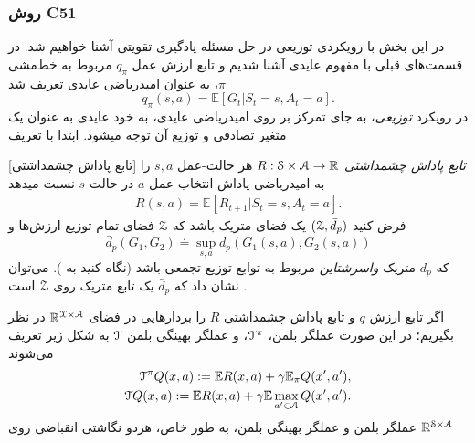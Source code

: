 \subsubsection{روش C51}
در این بخش با رویکردی توزیعی در حل مسئله یادگیری تقویتی آشنا خواهیم شد. در قسمت‌های قبلی با مفهوم عایدی آشنا شدیم و تابع ارزش عمل 
$q_\pi$
مربوط به خط‌مشی $\pi$، به عنوان امیدریاضی عایدی تعریف شد
$$q_\pi(s,a) = \mathbb{E}\left[G_t| S_t=s, A_t = a\right].$$
در رویکرد 
\textit{توزیعی}،
به جای تمرکز بر روی امیدریاضی عایدی، به خود عایدی به عنوان یک متغیر تصادفی و توزیع آن توجه می\nf شود. ابتدا با تعریف 

[تابع پاداش چشمداشتی]
\textit{تابع پاداش چشمداشتی}
$R: \EuScript{S} \times \EuScript{A} \to \mathbb{R}$
هر حالت-عمل $s,a$ را به امیدریاضی پاداش انتخاب عمل $a$ در حالت $s$ نسبت می\nf دهد
\begin{align}
	R(s,a) = \mathbb{E}\left[R_{t+1}|S_t=s, A_t=a\right].
\end{align}
فرض کنید 
$(\EuScript{Z}, \bar{d}_p)$
یک فضای متریک باشد که $\EuScript{Z}$ فضای تمام توزیع ارزش‌ها و
$$\bar{d}_p(G_1, G_2) \doteq \sup_{s,a} d_p(G_1(s,a), G_2(s,a))$$
که $d_p$ متریک 
\textit{واسرشتاین}
مربوط به توابع توزیع تجمعی باشد (نگاه کنید به 
\cite{bickel1981some}).
می‌توان نشان داد که $\bar{d}_p$ یک تابع متریک روی $\EuScript{Z}$ است
\cite{bellemare2017distributional}.

اگر تابع ارزش $q$ و تابع پاداش چشمداشتی $R$ را بردارهایی در فضای 
$\mathbb{R}^{\EuScript{X \times A}}$ 
در نظر بگیریم؛ در این صورت عملگر بلمن، $\EuScript{T}^\pi$، و عملگر بهینگی بلمن $\EuScript{T}$ به شکل زیر تعریف می‌شوند
\begin{align}
\EuScript{T}^\pi Q(x,a) := \mathbb{E} R(x,a) + \gamma \mathbb{E}_\pi Q(x',a'), \\ \nonumber
\EuScript{T} Q(x,a) := \mathbb{E} R(x,a) + \gamma \mathbb{E} \max_{a' \in \EuScript{A}} Q(x',a'). \nonumber
\end{align}
عملگر بلمن و عملگر بهینگی بلمن، به طور خاص، هردو نگاشتی انقباضی روی
$\mathbb{R}^{\EuScript{S} \times \EuScript{A}}$


